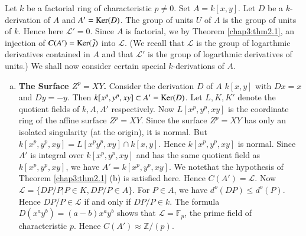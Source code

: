 Let $k$ be a factorial ring of characteristic $p \neq 0$. Set $A =
k [x, y]$. Let $D$ be a $k$-derivation of $A$ and $A' = \operatorname{Ker}
(D)$. The group of units $U$ of $A$ is the group of units of
$k$. Hence here $\mathscr{L}' = 0$. Since $A$ is factorial, we by
Theorem \ref{chap3:thm2.1}, an injection of $C(A') = \operatorname{Ker} (\bar{j})$ into
$\mathscr{L}$. (We recall that $\mathscr{L}$ is the group of
logarthmic derivatives contained in $A$ and that $\mathscr{L}'$ is
the group of logarthmic derivatives of units.) We shall now
consider certain special $k$-derivations of $A$.  
\begin{enumerate}[(a)]
\item \textbf{The Surface {\boldmath$Z^p = XY$}.} Consider the
  derivation $D$ of 
  $A $ $k[x, y]$ with $Dx = x$ and $Dy = - y$. Then $k [x^p, y^p, xy]
  \subset A' = \operatorname{Ker} (D)$. Let $L, K, K'$ denote the quotient fields of
  $k, A, A'$ respectively. Now $L [x^p, y^p, xy]$ is the coordinate
  ring of the affine surface $Z^p = XY$. Since the surface $Z^p = XY$
  has only an isolated singularity (at the origin), it is normal.  But
  $k [x^p, y^p, xy] = L [x^p y^p, xy] \cap k [x, y]$. Hence $k [x^p,
    y^p, xy]$ is normal. Since $A'$ is integral over $k [x^p, y^p,
    xy]$ and has the same quotient field as $k [x^p, y^p, xy]$, we
  have $A' = k [x^p, y^p, xy]$. We note\pageoriginale that the
  hypothesis of Theorem \ref{chap3:thm2.1} (b) is satisfied
  here. Hence $C(A') = \mathscr{L}$. Now 
  $\mathscr{L} = \big\{DP/P \big| P\in K, DP/P \in A \big\}$. For $P
  \in A$, we have $d^o (DP) \le d^o (P)$. Hence $DP/P \in \mathscr{L}$
  if and only if $DP/P \in k$. The formula  $D(x^a y^b) = (a-b) x^a
  y^b$ shows that $\mathscr{L} = \mathbb{F}_p$, the prime field of
  characteristic $p$. Hence $C (A') \approx \mathbb{Z}/(p)$. 


\end{enumerate}
